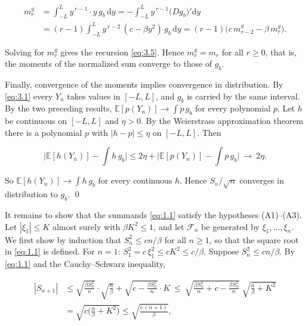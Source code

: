 \documentclass[aip,jmp,preprint,onecolumn,floatfix,superscriptaddress,nofootinbib,11pt]{revtex4-2}
\theoremstyle{plain}
\theoremstyle{remark}
\numberwithin{equation}{section}
\newcommand{\dd}{\mathrm{d}}
\newcommand{\E}{\mathbb{E}}
\begin{document}
\begin{equation*}
\begin{aligned} m_r^{g}&=\int_{-L}^{L}y^{\,r-1}\cdot y\,g_b\,\dd y=-\int_{-L}^{L}y^{\,r-1}\big(Dg_b\big)'\dd y\\[4pt] &=(r-1)\int_{-L}^{L}y^{\,r-2}\,(c-\beta y^{2})\,g_b\,\dd y=(r-1)\big(c\,m_{r-2}^{g}-\beta\,m_r^{g}\big). \end{aligned}
\end{equation*}

Solving for $m_r^{g}$ gives the recursion \eqref{eq:3.5}. Hence $m_r^{g}=m_r$ for all $r\ge0$, that is, the moments of the normalized sum converge to those of $g_b$.

Finally, convergence of the moments implies convergence in distribution. By \eqref{eq:3.1} every $Y_n$ takes values in $[-L,L]$, and $g_b$ is carried by the same interval. By the two preceding results, $\E[p(Y_n)]\to\int p\,g_b$ for every polynomial $p$. Let $h$ be continuous on $[-L,L]$ and $\eta>0$. By the Weierstrass approximation theorem there is a polynomial $p$ with $|h-p|\le\eta$ on $[-L,L]$. Then

\begin{equation*}
\Big|\E[h(Y_n)]-\int h\,g_b\Big|\le 2\eta+\Big|\E[p(Y_n)]-\int p\,g_b\Big|\ \longrightarrow\ 2\eta .
\end{equation*}

So $\E[h(Y_n)]\to\int h\,g_b$ for every continuous $h$. Hence $S_n/\sqrt n$ converges in distribution to $g_b$. \qed

It remains to show that the summands \eqref{eq:1.1} satisfy the hypotheses (A1)--(A3). Let $|\xi_1|\le K$ almost surely with $\beta K^{2}\le1$, and let $\mathcal F_n$ be generated by $\xi_1,\dots,\xi_n$. We first show by induction that $S_n^{2}\le cn/\beta$ for all $n\ge1$, so that the square root in \eqref{eq:1.1} is defined. For $n=1$: $S_1^{2}=c\,\xi_1^{2}\le cK^{2}\le c/\beta$. Suppose $S_n^{2}\le cn/\beta$. By \eqref{eq:1.1} and the Cauchy--Schwarz inequality,

\begin{equation*}
\begin{aligned} |S_{n+1}|&\le \sqrt{\frac{\beta S_n^{2}}{n}}\cdot\sqrt{\frac n\beta}+\sqrt{c-\frac{\beta S_n^{2}}{n}}\cdot K\ \le\ \sqrt{\frac{\beta S_n^{2}}{n}+c-\frac{\beta S_n^{2}}{n}}\;\sqrt{\frac n\beta+K^{2}}\\[4pt] &=\sqrt{c\Big(\frac n\beta+K^{2}\Big)}\le\sqrt{\frac{c\,(n+1)}{\beta}} , \end{aligned}
\end{equation*}
\end{document}
